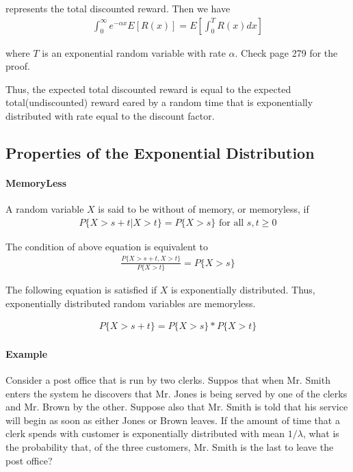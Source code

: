 \documentclass[10 pt,final]{article}
\newcommand{\impo}[1]{{\color{magenta} #1}}
\begin{document}
represents the total discounted reward.  Then we have
\begin{align*}
\int_0^{\infty} e^{-\alpha x} E[R(x)] = E[\int_0^T R(x)dx]
\end{align*}

where $T$ is an exponential random variable with rate $\alpha$. Check page 279 for the proof.

Thus, \impo{the expected total discounted reward is equal to the expected total(undiscounted) reward eared by a random time that is exponentially distributed with rate equal to the discount factor.}


\subsection{Properties of the Exponential Distribution}
\paragraph{MemoryLess} A random variable $X$ is said to be without of memory, or memoryless, if
\begin{align*}
P\{X > s+t| X>t\} = P\{X>s\} \mbox{  for all $s,t \geq 0$}
\end{align*}

The condition of above equation is equivalent to
\begin{align*}
\frac{P\{X>s+t, X>t\}}{P\{X>t\}} = P\{X>s\}
\end{align*}

The following equation is satisfied if $X$ is exponentially distributed. Thus, exponentially distributed random variables are memoryless.

\impo{
\begin{align*}
P\{X>s+t\} = P\{X>s\} * P\{X>t\}
\end{align*}
}

\paragraph{Example} Consider a post office that is run by two clerks. Suppos that when Mr. Smith enters the system he discovers that Mr. Jones is being served by one of the clerks and Mr. Brown by the other. Suppose also that Mr. Smith is told that his service will begin as soon as either Jones or Brown leaves. If the amount of time that a clerk spends with customer is exponentially distributed with mean $1/\lambda$, what is the probability that, of the three customers, Mr. Smith is the last to leave the post office?
\end{document}

